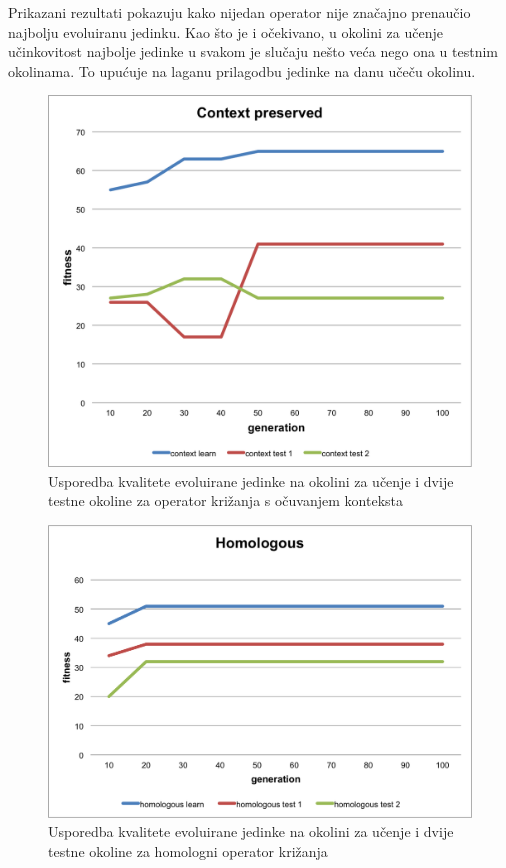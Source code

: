 Prikazani rezultati pokazuju kako nijedan operator nije značajno prenaučio najbolju evoluiranu jedinku. Kao što je i očekivano, u okolini za učenje učinkovitost najbolje jedinke u svakom je slučaju nešto veća nego ona u testnim okolinama. To upućuje na laganu prilagodbu jedinke na danu učeču okolinu.
\begin{figure}[H]
	\centering
	\includegraphics[scale=0.8]{./slike/cross-validation/context.png}
	\caption{Usporedba kvalitete evoluirane jedinke na okolini za učenje i dvije testne okoline za operator križanja s očuvanjem konteksta}
	\label{context}
\end{figure}

\begin{figure}[H]
	\centering
	\includegraphics[scale=0.8]{./slike/cross-validation/homo.png}
	\caption{Usporedba kvalitete evoluirane jedinke na okolini za učenje i dvije testne okoline za homologni operator križanja}
	\label{homo}
\end{figure}

